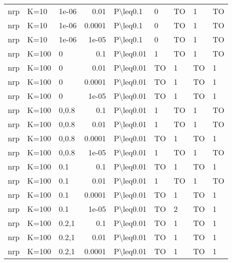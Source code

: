 \begin{longtable}{lllrlllll}
 nrp           & K=10      & 1e-06 & 0.01   & P\textbackslash{}leq0.1   & 0    & TO   & 1        & TO      \\
 nrp           & K=10      & 1e-06 & 0.0001 & P\textbackslash{}leq0.1   & 0    & TO   & 1        & TO      \\
 nrp           & K=10      & 1e-06 & 1e-05  & P\textbackslash{}leq0.1   & 0    & TO   & 1        & TO      \\
 nrp           & K=100     & 0     & 0.1    & P\textbackslash{}leq0.01  & 1    & TO   & 1        & TO      \\
 nrp           & K=100     & 0     & 0.01   & P\textbackslash{}leq0.01  & TO   & 1    & TO       & 1       \\
 nrp           & K=100     & 0     & 0.0001 & P\textbackslash{}leq0.01  & TO   & 1    & TO       & 1       \\
 nrp           & K=100     & 0     & 1e-05  & P\textbackslash{}leq0.01  & TO   & 1    & TO       & 1       \\
 nrp           & K=100     & 0,0.8 & 0.1    & P\textbackslash{}leq0.01  & 1    & TO   & 1        & TO      \\
 nrp           & K=100     & 0,0.8 & 0.01   & P\textbackslash{}leq0.01  & 1    & TO   & 1        & TO      \\
 nrp           & K=100     & 0,0.8 & 0.0001 & P\textbackslash{}leq0.01  & TO   & 1    & TO       & 1       \\
 nrp           & K=100     & 0,0.8 & 1e-05  & P\textbackslash{}leq0.01  & 1    & TO   & 1        & TO      \\
 nrp           & K=100     & 0.1   & 0.1    & P\textbackslash{}leq0.01  & TO   & 1    & TO       & 1       \\
 nrp           & K=100     & 0.1   & 0.01   & P\textbackslash{}leq0.01  & 1    & TO   & 1        & TO      \\
 nrp           & K=100     & 0.1   & 0.0001 & P\textbackslash{}leq0.01  & TO   & 1    & TO       & 1       \\
 nrp           & K=100     & 0.1   & 1e-05  & P\textbackslash{}leq0.01  & TO   & 2    & TO       & 1       \\
 nrp           & K=100     & 0.2,1 & 0.1    & P\textbackslash{}leq0.01  & TO   & 1    & TO       & 1       \\
 nrp           & K=100     & 0.2,1 & 0.01   & P\textbackslash{}leq0.01  & TO   & 1    & TO       & 1       \\
 nrp           & K=100     & 0.2,1 & 0.0001 & P\textbackslash{}leq0.01  & TO   & 1    & TO       & 1       \\

\end{longtable}
